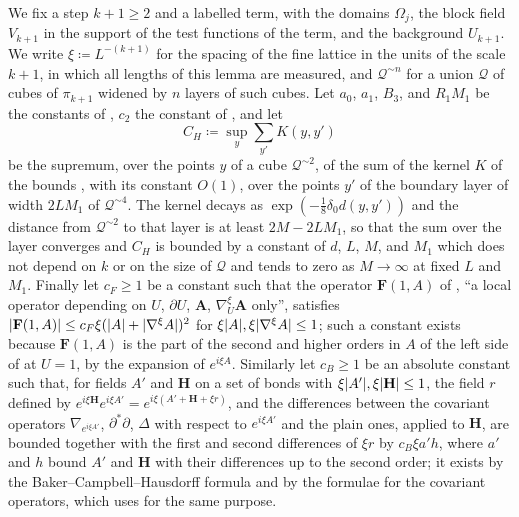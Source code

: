 \documentclass[11pt]{preprint}
\DeclarePairedDelimiter{\abs}{\lvert}{\rvert}
\numberwithin{equation}{section}
\theoremstyle{definition}
\theoremstyle{remark}
\theoremstyle{plain}
\begin{document}
We fix a step $k + 1 \geq 2$ and a labelled term, with the domains $\Omega_j$, the block field $V_{k+1}$ in the support of the test functions of the term, and the background $U_{k+1}$. We write $\xi \coloneqq L^{-(k+1)}$ for the spacing of the fine lattice in the units of the scale $k + 1$, in which all lengths of this lemma are measured, and $\mathcal Q^{\sim n}$ for a union $\mathcal Q$ of cubes of $\pi_{k+1}$ widened by $n$ layers of such cubes. Let $a_0$, $a_1$, $B_3$, and $R_1M_1$ be the constants of \cite[Theorem~1, p.~279]{BalabanVAR}, $c_2$ the constant of \cite[Proposition~2, p.~26]{BalabanAVG}, and let
\begin{equation}\label{eq:kernel-layer-constant}
    C_H \coloneqq \sup_y\sum_{y'}K(y, y')
\end{equation}
be the supremum, over the points $y$ of a cube $\mathcal Q^{\sim2}$, of the sum of the kernel $K$ of the bounds \cite[(190), p.~308]{BalabanVAR}, with its constant $O(1)$, over the points $y'$ of the boundary layer of width $2LM_1$ of $\mathcal Q^{\sim4}$. The kernel decays as $\exp(-\frac18\delta_0d(y, y'))$ and the distance from $\mathcal Q^{\sim2}$ to that layer is at least $2M - 2LM_1$, so that the sum over the layer converges and $C_H$ is bounded by a constant of $d$, $L$, $M$, and $M_1$ which does not depend on $k$ or on the size of $\mathcal Q$ and tends to zero as $M \to \infty$ at fixed $L$ and $M_1$. Finally let $c_F \geq 1$ be a constant such that the operator $\mathbf F(1, A)$ of \cite[(3.11), p.~272]{BalabanRG1}, ``a local operator depending on $U$, $\partial U$, $\mathbf A$, $\nabla^\xi_U\mathbf A$ only'', satisfies $\abs{\mathbf F(1, A)} \leq c_F\xi(\abs A + \abs{\nabla^\xi A})^2$ for $\xi\abs A, \xi\abs{\nabla^\xi A} \leq 1$; such a constant exists because $\mathbf F(1, A)$ is the part of the second and higher orders in $A$ of the left side of \cite[(3.11)]{BalabanRG1} at $U = 1$, by the expansion \cite[(22), (23), p.~281]{BalabanVAR} of $e^{i\xi A}$. Similarly let $c_B \geq 1$ be an absolute constant such that, for fields $A'$ and $\mathbf H$ on a set of bonds with $\xi\abs{A'}, \xi\abs{\mathbf H} \leq 1$, the field $r$ defined by $e^{i\xi\mathbf H}e^{i\xi A'} = e^{i\xi(A' + \mathbf H + \xi r)}$, and the differences between the covariant operators $\nabla_{e^{i\xi A'}}$, $\partial^*\partial$, $\Delta$ with respect to $e^{i\xi A'}$ and the plain ones, applied to $\mathbf H$, are bounded together with the first and second differences of $\xi r$ by $c_B\xi a'h$, where $a'$ and $h$ bound $A'$ and $\mathbf H$ with their differences up to the second order; it exists by the Baker--Campbell--Hausdorff formula and by the formulae \cite[(1.43)--(1.54)]{BalabanREG} for the covariant operators, which \cite[p.~272]{BalabanRG1} uses for the same purpose.
\end{document}
